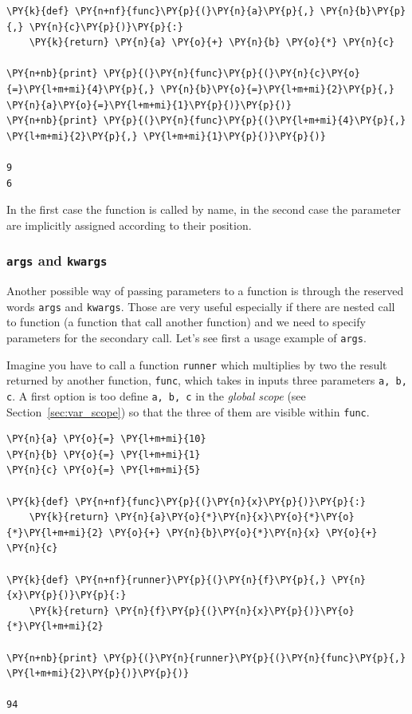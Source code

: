 \begin{codebox}
\begin{Verbatim}[commandchars=\\\{\}]
\PY{k}{def} \PY{n+nf}{func}\PY{p}{(}\PY{n}{a}\PY{p}{,} \PY{n}{b}\PY{p}{,} \PY{n}{c}\PY{p}{)}\PY{p}{:}
    \PY{k}{return} \PY{n}{a} \PY{o}{+} \PY{n}{b} \PY{o}{*} \PY{n}{c}

\PY{n+nb}{print} \PY{p}{(}\PY{n}{func}\PY{p}{(}\PY{n}{c}\PY{o}{=}\PY{l+m+mi}{4}\PY{p}{,} \PY{n}{b}\PY{o}{=}\PY{l+m+mi}{2}\PY{p}{,} \PY{n}{a}\PY{o}{=}\PY{l+m+mi}{1}\PY{p}{)}\PY{p}{)}
\PY{n+nb}{print} \PY{p}{(}\PY{n}{func}\PY{p}{(}\PY{l+m+mi}{4}\PY{p}{,} \PY{l+m+mi}{2}\PY{p}{,} \PY{l+m+mi}{1}\PY{p}{)}\PY{p}{)}

9
6
\end{Verbatim}
\end{codebox}

In the first case the function is called by name, in the second case the parameter are implicitly assigned according to their position.

\subsubsection{\texttt{args} and \texttt{kwargs}}
\label{sec:kwargs_args}

Another possible way of passing parameters to a function is through the reserved words 
\texttt{args} and \texttt{kwargs}. Those are very useful especially if there are nested call 
to function (a function that call another function) and we need to specify parameters for the secondary call.
Let's see first a usage example of \texttt{args}.

Imagine you have to call a function \texttt{runner} which multiplies by two the result returned
by another function, \texttt{func}, which takes in inputs three parameters \texttt{a, b, c}.
A first option is too define \texttt{a, b, c} in the \emph{global scope} (see Section~\ref{sec:var_scope}) 
so that the three of them are visible within \texttt{func}.
\begin{codebox}
\begin{Verbatim}[commandchars=\\\{\}]
\PY{n}{a} \PY{o}{=} \PY{l+m+mi}{10}
\PY{n}{b} \PY{o}{=} \PY{l+m+mi}{1}
\PY{n}{c} \PY{o}{=} \PY{l+m+mi}{5}
 		
\PY{k}{def} \PY{n+nf}{func}\PY{p}{(}\PY{n}{x}\PY{p}{)}\PY{p}{:}
    \PY{k}{return} \PY{n}{a}\PY{o}{*}\PY{n}{x}\PY{o}{*}\PY{o}{*}\PY{l+m+mi}{2} \PY{o}{+} \PY{n}{b}\PY{o}{*}\PY{n}{x} \PY{o}{+} \PY{n}{c}
 		
\PY{k}{def} \PY{n+nf}{runner}\PY{p}{(}\PY{n}{f}\PY{p}{,} \PY{n}{x}\PY{p}{)}\PY{p}{:}
    \PY{k}{return} \PY{n}{f}\PY{p}{(}\PY{n}{x}\PY{p}{)}\PY{o}{*}\PY{l+m+mi}{2}
 		
\PY{n+nb}{print} \PY{p}{(}\PY{n}{runner}\PY{p}{(}\PY{n}{func}\PY{p}{,} \PY{l+m+mi}{2}\PY{p}{)}\PY{p}{)}
 	
94
\end{Verbatim}
\end{codebox}

